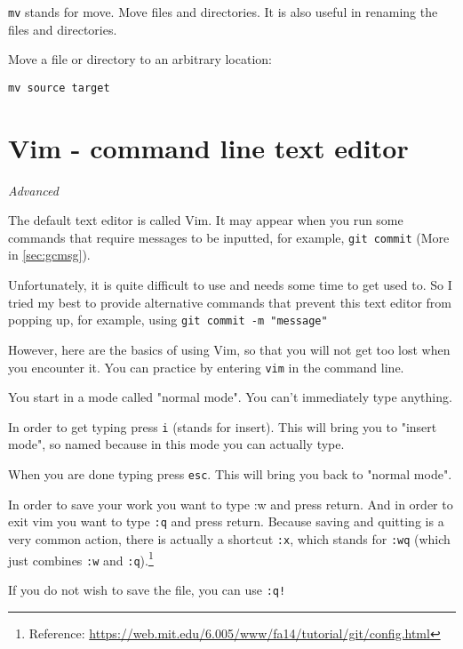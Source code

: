 \texttt{mv} stands for move. Move files and directories. It is also useful in renaming the files and directories.
\vspace{6mm}

Move a file or directory to an arbitrary location:

\texttt{mv source target}

\section{Vim - command line text editor}
\label{sec:vim}

\textit{Advanced}
\vspace{6mm}

The default text editor is called Vim. It may appear when you run some commands that require messages to be inputted, for example, \texttt{git commit} (More in \cref{sec:gcmsg}).

Unfortunately, it is quite difficult to use and needs some time to get used to. So I tried my best to provide alternative commands that prevent this text editor from popping up, for example, using \texttt{git commit -m "message"}

However, here are the basics of using Vim, so that you will not get too lost when you encounter it. You can practice by entering \texttt{vim} in the command line.

You start in a mode called "normal mode". You can’t immediately type anything.

In order to get typing press \texttt{i} (stands for insert). This will bring you to "insert mode", so named because in this mode you can actually type.

When you are done typing press \texttt{esc}. This will bring you back to "normal mode".

In order to save your work you want to type :w and press return. And in order to exit vim you want to type \texttt{:q} and press return. Because saving and quitting is a very common action, there is actually a shortcut \texttt{:x}, which stands for \texttt{:wq} (which just combines \texttt{:w} and \texttt{:q}).\footnote{Reference: \url{https://web.mit.edu/6.005/www/fa14/tutorial/git/config.html}}


If you do not wish to save the file, you can use \texttt{:q!}


